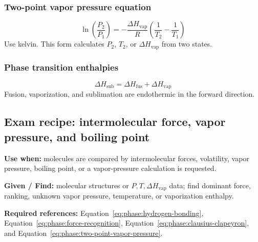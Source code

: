 \subsubsection{Two-point vapor pressure equation}
\begin{equation}
\label{eq:phase:two-point-vapor-pressure}
\ln\left(\frac{P_2}{P_1}\right)
=-\frac{\Delta H_{\mathrm{vap}}}{R}\left(\frac{1}{T_2}-\frac{1}{T_1}\right)
\end{equation}
Use kelvin. This form calculates \(P_2\), \(T_2\), or \(\Delta H_{\mathrm{vap}}\) from two states.

\subsubsection{Phase transition enthalpies}
\begin{equation}
\label{eq:phase:sublimation-enthalpy}
\Delta H_{\mathrm{sub}}=\Delta H_{\mathrm{fus}}+\Delta H_{\mathrm{vap}}
\end{equation}
Fusion, vaporization, and sublimation are endothermic in the forward direction.

\subsection{Exam recipe: intermolecular force, vapor pressure, and boiling point}
\textbf{Use when:} molecules are compared by intermolecular forces, volatility, vapor pressure, boiling point, or a vapor-pressure calculation is requested.

\textbf{Given / Find:} molecular structures or \(P,T,\Delta H_{\mathrm{vap}}\) data; find dominant force, ranking, unknown vapor pressure, temperature, or vaporization enthalpy.

\textbf{Required references:} Equation~\ref{eq:phase:hydrogen-bonding}, Equation~\ref{eq:phase:force-recognition}, Equation~\ref{eq:phase:clausius-clapeyron}, and Equation~\ref{eq:phase:two-point-vapor-pressure}.


